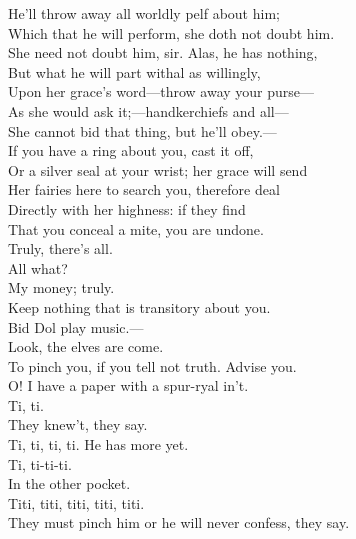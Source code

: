 \documentclass[a4paper,oneside]{memoir}
\begin{document}
\begin{drama*}
He'll throw away all worldly pelf about him;\\
Which that he will perform, she doth not doubt him.\\
\facespeaks She need not doubt him, sir. Alas, he has nothing,\\
But what he will part withal as willingly,\\
Upon her grace's word---throw away your purse---\\
As she would ask it;---handkerchiefs and all---\\
She cannot bid that thing, but he'll obey.---\\
If you have a ring about you, cast it off,\\
Or a silver seal at your wrist; her grace will send\\
Her fairies here to search you, therefore deal\\
Directly with her highness: if they find\\
That you conceal a mite, you are undone.\\
\dapperspeaks Truly, there's all.\\
\facespeaks {} All what?\\
\dapperspeaks {} My money; truly.\\
\facespeaks Keep nothing that is transitory about you.\\
Bid Dol play music.---\\
 Look, the elves are come.\\
To pinch you, if you tell not truth. Advise you.\\
\dapperspeaks O! I have a paper with a spur-ryal in't.\\
\facespeaks {} Ti, ti.\\
They knew't, they say.\\
\subtlespeaks {} Ti, ti, ti, ti. He has more yet.\\
\facespeaks Ti, ti-ti-ti.\\
 In the other pocket.\\
\subtlespeaks {} Titi, titi, titi, titi, titi.\\
They must pinch him or he will never confess, they say.\\

\end{drama*}
\end{document}
